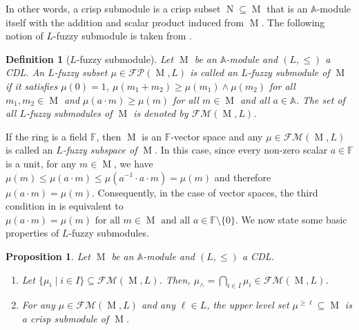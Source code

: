 \documentclass[a4paper,10pt]{article}
\newtheorem{definition}[theorem]{Definition}
\newtheorem{proposition}[theorem]{Proposition}
\newcommand{\bba}{\mathbb{A}}
\newcommand{\bbf}{\mathbb{F}}
\newcommand{\calfm}{\mathcal{F\!M}}
\newcommand{\calfp}{\mathcal{FP}}
\DeclareMathOperator{\Mo}{M}
\DeclareMathOperator{\No}{N}
\begin{document}
In other words, a crisp submodule is a crisp subset \(\No \subseteq \Mo\) that is an \(\bba\)-module itself with the addition and scalar product induced from \(\Mo\). 
The following notion of \(L\)-fuzzy submodule is taken from \cite{mashinchi1992fuzzy}.

\begin{definition}[\(L\)-fuzzy submodule]
\label{def:fuzzy_submodule}
Let \(\Mo\) be an \(\bba\)-module and \((L,\leq)\) a CDL. An \(L\)-fuzzy subset \(\mu \in \calfp(\Mo,L)\) is called an \emph{\(L\)-fuzzy submodule} of \(\Mo\) if it satisfies \(\mu(0)=1\), \(\mu(m_1+m_2) \geq \mu(m_1) \wedge \mu(m_2)\) for all \(m_1,m_2 \in \Mo\) and \(\mu(a \cdot m) \geq \mu(m)\) for all \(m \in \Mo\) and all \(a \in \bba\). The set of all \(L\)-fuzzy submodules of \(\Mo\) is denoted by \(\calfm(\Mo,L)\).
\end{definition}

If the ring is a field \(\bbf\), then \(\Mo\) is an \(\bbf\)-vector space and any \(\mu \in \calfm(\Mo,L)\) is called an \emph{\(L\)-fuzzy subspace of $\Mo$}. In this case, since every non-zero scalar \(a \in \bbf\) is a unit, for any \(m \in \Mo\), we have
\( \mu(m) \leq \mu(a \cdot m) \leq \mu(a^{-1} \cdot a \cdot m) = \mu(m) \)
and therefore \(\mu(a \cdot m) = \mu(m)\). Consequently, in the case of vector spaces, the third condition in  is equivalent to
\(\mu(a \cdot m) = \mu(m) \text{ for all } m \in \Mo \text{ and all } a \in \bbf \setminus \{0\}\).
We now state some basic properties of \(L\)-fuzzy submodules.

\begin{proposition}
\label{prop:submodules_properties}
Let \(\Mo\) be an \(\bba\)-module and \((L,\leq)\) a CDL.
\begin{enumerate}
\item Let \(\{\mu_i \mid i \in I\} \subseteq \calfm(\Mo,L)\). Then, \(\mu_{\wedge} = \bigcap_{i\in I} \mu_i \in \calfm(\Mo,L)\).
\item For any \(\mu \in \calfm(\Mo,L)\) and any \(\ell \in L\), the upper level set \(\mu^{\geq \ell} \subseteq \Mo\) is a crisp submodule of \(\Mo\).
\end{enumerate}
\end{proposition}
\end{document}
